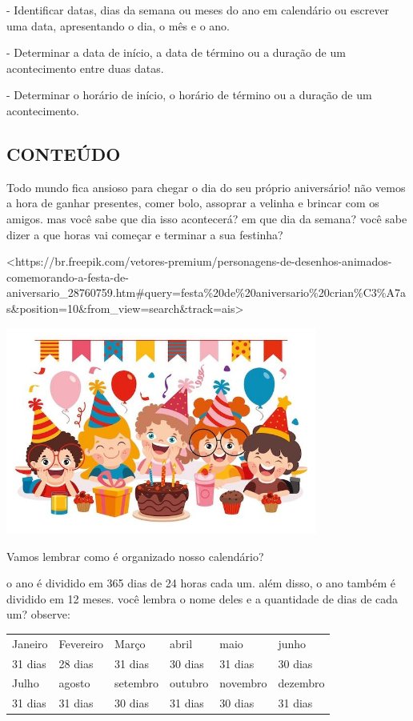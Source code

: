 - Identificar datas, dias da semana ou meses do ano em calendário ou
escrever uma data, apresentando o dia, o mês e o ano.

- Determinar a data de início, a data de término ou a duração de um
acontecimento entre duas datas.

- Determinar o horário de início, o horário de término ou a duração de
um acontecimento.

\subsection{CONTEÚDO}\label{conteuxfado-3}

Todo mundo fica ansioso para chegar o dia do seu próprio aniversário!
não vemos a hora de ganhar presentes, comer bolo, assoprar a velinha e
brincar com os amigos. mas você sabe que dia isso acontecerá? em que dia
da semana? você sabe dizer a que horas vai começar e terminar a sua
festinha?

\textless{}https://br.freepik.com/vetores-premium/personagens-de-desenhos-animados-comemorando-a-festa-de-aniversario\_28760759.htm\#query=festa\%20de\%20aniversario\%20crian\%C3\%A7as\&position=10\&from\_view=search\&track=ais\textgreater{}

\includegraphics[width=4.02731in,height=2.68282in]{media/image34.jpg}

Vamos lembrar como é organizado nosso calendário?

o ano é dividido em 365 dias de 24 horas cada um. além disso, o ano
também é dividido em 12 meses. você lembra o nome deles e a quantidade
de dias de cada um? observe:

\begin{longtable}[]{@{}llllll@{}}
\toprule
Janeiro & Fevereiro & Março & abril & maio & junho\tabularnewline
31 dias & 28 dias & 31 dias & 30 dias & 31 dias & 30 dias\tabularnewline
Julho & agosto & setembro & outubro & novembro & dezembro\tabularnewline
31 dias & 31 dias & 30 dias & 31 dias & 30 dias & 31 dias\tabularnewline
\bottomrule
\end{longtable}

